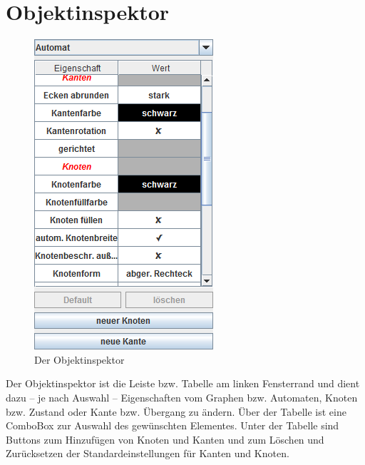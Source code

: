 \section{Objektinspektor}
\begin{figure}[!htbp]
\centering
\includegraphics{pic/screenshots/oi}%
\caption{Der Objektinspektor}%
\end{figure}
Der Objektinspektor ist die Leiste bzw. Tabelle am linken Fensterrand und dient dazu – je nach  Auswahl – Eigenschaften vom Graphen bzw. Automaten, Knoten bzw. Zustand oder Kante bzw. Übergang zu ändern. Über der Tabelle ist eine ComboBox zur Auswahl des gewünschten Elementes. Unter der Tabelle sind Buttons zum Hinzufügen von Knoten und Kanten und zum Löschen und Zurücksetzen der Standardeinstellungen für Kanten und Knoten.
